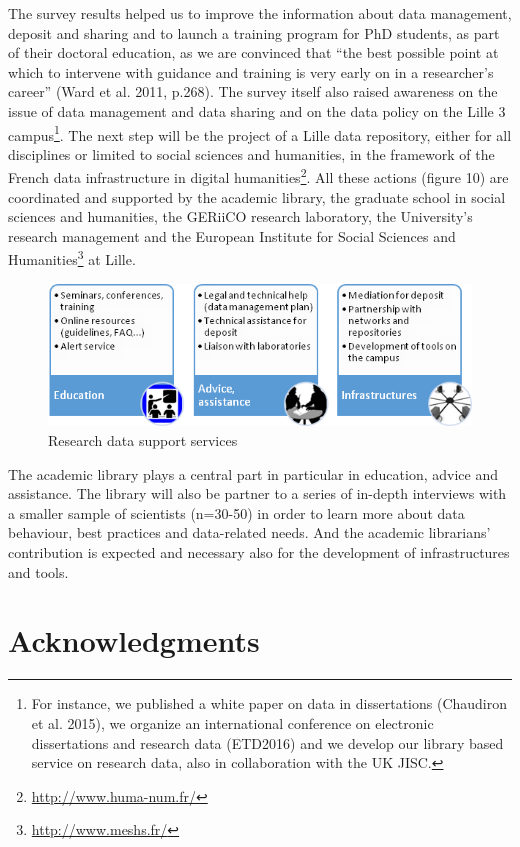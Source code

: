 \documentclass[a4paper,
fontsize=11pt,
oneside,
numbers=noperiodatend,
parskip=half-,
bibliography=totoc,
final
]{scrartcl}
\begin{document}
The survey results helped us to improve the information about data
management, deposit and sharing and to launch a training program for PhD
students, as part of their doctoral education, as we are convinced that
\enquote{the best possible point at which to intervene with guidance and
training is very early on in a researcher's career} (Ward et al. 2011,
p.268). The survey itself also raised awareness on the issue of data
management and data sharing and on the data policy on the Lille 3
campus\footnote{For instance, we published a white paper on data in
  dissertations (Chaudiron et al. 2015), we organize an international
  conference on electronic dissertations and research data (ETD2016) and
  we develop our library based service on research data, also in
  collaboration with the UK JISC.}. The next step will be the project of
a Lille data repository, either for all disciplines or limited to social
sciences and humanities, in the framework of the French data
infrastructure in digital humanities\footnote{\url{http://www.huma-num.fr/}}.
All these actions (figure 10) are coordinated and supported by the
academic library, the graduate school in social sciences and humanities,
the GERiiCO research laboratory, the University's research management
and the European Institute for Social Sciences and Humanities\footnote{\url{http://www.meshs.fr/}}
at Lille.

\begin{figure}[htbp]
\centering
\includegraphics{figures/media/image10.png}
\caption{Research data support services}
\end{figure}

The academic library plays a central part in particular in education,
advice and assistance. The library will also be partner to a series of
in-depth interviews with a smaller sample of scientists (n=30-50) in
order to learn more about data behaviour, best practices and
data-related needs. And the academic librarians' contribution is
expected and necessary also for the development of infrastructures and
tools.

\section*{Acknowledgments}\label{acknowledgments}
\end{document}
